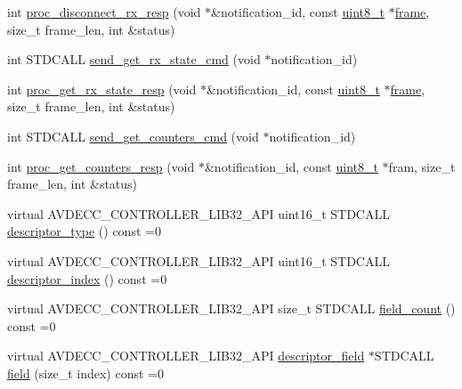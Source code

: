 \begin{DoxyCompactItemize}
int \hyperlink{classavdecc__lib_1_1stream__input__descriptor__imp_ac79268a39683a35aa2b5aacba4ccb9c4}{proc\+\_\+disconnect\+\_\+rx\+\_\+resp} (void $\ast$\&notification\+\_\+id, const \hyperlink{stdint_8h_aba7bc1797add20fe3efdf37ced1182c5}{uint8\+\_\+t} $\ast$\hyperlink{gst__avb__playbin_8c_ac8e710e0b5e994c0545d75d69868c6f0}{frame}, size\+\_\+t frame\+\_\+len, int \&status)
\item 
int S\+T\+D\+C\+A\+LL \hyperlink{classavdecc__lib_1_1stream__input__descriptor__imp_ae05f574840745cc2e57084621bc560a5}{send\+\_\+get\+\_\+rx\+\_\+state\+\_\+cmd} (void $\ast$notification\+\_\+id)
\item 
int \hyperlink{classavdecc__lib_1_1stream__input__descriptor__imp_acb106a2e0c8523afeaa64062812c67e2}{proc\+\_\+get\+\_\+rx\+\_\+state\+\_\+resp} (void $\ast$\&notification\+\_\+id, const \hyperlink{stdint_8h_aba7bc1797add20fe3efdf37ced1182c5}{uint8\+\_\+t} $\ast$\hyperlink{gst__avb__playbin_8c_ac8e710e0b5e994c0545d75d69868c6f0}{frame}, size\+\_\+t frame\+\_\+len, int \&status)
\item 
int S\+T\+D\+C\+A\+LL \hyperlink{classavdecc__lib_1_1stream__input__descriptor__imp_a619478ec7108e822b4c23f87c651b65a}{send\+\_\+get\+\_\+counters\+\_\+cmd} (void $\ast$notification\+\_\+id)
\item 
int \hyperlink{classavdecc__lib_1_1stream__input__descriptor__imp_a6aa536a941d8352a30b5976a5224f01d}{proc\+\_\+get\+\_\+counters\+\_\+resp} (void $\ast$\&notification\+\_\+id, const \hyperlink{stdint_8h_aba7bc1797add20fe3efdf37ced1182c5}{uint8\+\_\+t} $\ast$fram, size\+\_\+t frame\+\_\+len, int \&status)
\item 
virtual A\+V\+D\+E\+C\+C\+\_\+\+C\+O\+N\+T\+R\+O\+L\+L\+E\+R\+\_\+\+L\+I\+B32\+\_\+\+A\+PI uint16\+\_\+t S\+T\+D\+C\+A\+LL \hyperlink{classavdecc__lib_1_1descriptor__base_a5112b70022171063ec5d3242bee9910e}{descriptor\+\_\+type} () const =0
\item 
virtual A\+V\+D\+E\+C\+C\+\_\+\+C\+O\+N\+T\+R\+O\+L\+L\+E\+R\+\_\+\+L\+I\+B32\+\_\+\+A\+PI uint16\+\_\+t S\+T\+D\+C\+A\+LL \hyperlink{classavdecc__lib_1_1descriptor__base_a7eed5583bffdf72d89021b188648c1b5}{descriptor\+\_\+index} () const =0
\item 
virtual A\+V\+D\+E\+C\+C\+\_\+\+C\+O\+N\+T\+R\+O\+L\+L\+E\+R\+\_\+\+L\+I\+B32\+\_\+\+A\+PI size\+\_\+t S\+T\+D\+C\+A\+LL \hyperlink{classavdecc__lib_1_1descriptor__base_ab1edf4996377ed957088a7b3b16aca7d}{field\+\_\+count} () const =0
\item 
virtual A\+V\+D\+E\+C\+C\+\_\+\+C\+O\+N\+T\+R\+O\+L\+L\+E\+R\+\_\+\+L\+I\+B32\+\_\+\+A\+PI \hyperlink{classavdecc__lib_1_1descriptor__field}{descriptor\+\_\+field} $\ast$S\+T\+D\+C\+A\+LL \hyperlink{classavdecc__lib_1_1descriptor__base_aa3716832eed0b6f6dcfba358c5d2c601}{field} (size\+\_\+t index) const =0

\end{DoxyCompactItemize}
